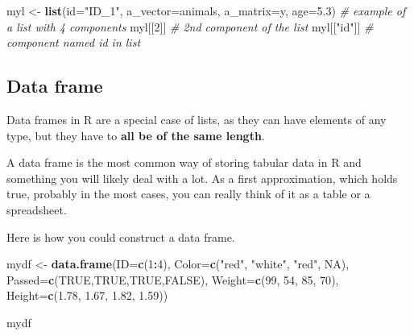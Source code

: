 \documentclass[]{book}
\newenvironment{Shaded}{\begin{snugshade}}{\end{snugshade}}
\newcommand{\KeywordTok}[1]{\textcolor[rgb]{0.13,0.29,0.53}{\textbf{#1}}}
\newcommand{\DataTypeTok}[1]{\textcolor[rgb]{0.13,0.29,0.53}{#1}}
\newcommand{\DecValTok}[1]{\textcolor[rgb]{0.00,0.00,0.81}{#1}}
\newcommand{\FloatTok}[1]{\textcolor[rgb]{0.00,0.00,0.81}{#1}}
\newcommand{\StringTok}[1]{\textcolor[rgb]{0.31,0.60,0.02}{#1}}
\newcommand{\CommentTok}[1]{\textcolor[rgb]{0.56,0.35,0.01}{\textit{#1}}}
\newcommand{\OtherTok}[1]{\textcolor[rgb]{0.56,0.35,0.01}{#1}}
\newcommand{\OperatorTok}[1]{\textcolor[rgb]{0.81,0.36,0.00}{\textbf{#1}}}
\newcommand{\NormalTok}[1]{#1}
\theoremstyle{definition}
\theoremstyle{definition}
\theoremstyle{remark}
\begin{document}
\begin{Shaded}
\begin{Highlighting}[]
\NormalTok{myl <-}\StringTok{ }\KeywordTok{list}\NormalTok{(}\DataTypeTok{id=}\StringTok{"ID_1"}\NormalTok{, }\DataTypeTok{a_vector=}\NormalTok{animals, }\DataTypeTok{a_matrix=}\NormalTok{y, }\DataTypeTok{age=}\FloatTok{5.3}\NormalTok{) }\CommentTok{# example of a list with 4 components}
\NormalTok{myl[[}\DecValTok{2}\NormalTok{]] }\CommentTok{# 2nd component of the list}
\NormalTok{myl[[}\StringTok{"id"}\NormalTok{]] }\CommentTok{# component named id in list}
\end{Highlighting}
\end{Shaded}

\subsection{Data frame}\label{data-frame}

Data frames in R are a special case of lists, as they can have elements
of any type, but they have to \textbf{all be of the same length}.

A data frame is the most common way of storing tabular data in R and
something you will likely deal with a lot. As a first approximation,
which holds true, probably in the most cases, you can really think of it
as a table or a spreadsheet.

Here is how you could construct a data frame.

\begin{Shaded}
\begin{Highlighting}[]
\NormalTok{mydf <-}\StringTok{ }\KeywordTok{data.frame}\NormalTok{(}\DataTypeTok{ID=}\KeywordTok{c}\NormalTok{(}\DecValTok{1}\OperatorTok{:}\DecValTok{4}\NormalTok{),}
                   \DataTypeTok{Color=}\KeywordTok{c}\NormalTok{(}\StringTok{"red"}\NormalTok{, }\StringTok{"white"}\NormalTok{, }\StringTok{"red"}\NormalTok{, }\OtherTok{NA}\NormalTok{),}
                   \DataTypeTok{Passed=}\KeywordTok{c}\NormalTok{(}\OtherTok{TRUE}\NormalTok{,}\OtherTok{TRUE}\NormalTok{,}\OtherTok{TRUE}\NormalTok{,}\OtherTok{FALSE}\NormalTok{),}
                   \DataTypeTok{Weight=}\KeywordTok{c}\NormalTok{(}\DecValTok{99}\NormalTok{, }\DecValTok{54}\NormalTok{, }\DecValTok{85}\NormalTok{, }\DecValTok{70}\NormalTok{),}
                   \DataTypeTok{Height=}\KeywordTok{c}\NormalTok{(}\FloatTok{1.78}\NormalTok{, }\FloatTok{1.67}\NormalTok{, }\FloatTok{1.82}\NormalTok{, }\FloatTok{1.59}\NormalTok{))}

\NormalTok{mydf}
\end{Highlighting}
\end{Shaded}
\end{document}
